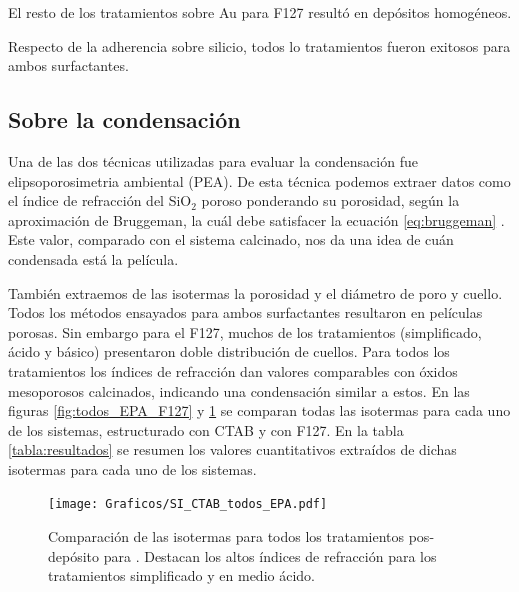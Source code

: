			El resto de los tratamientos sobre Au para F127 resultó en depósitos homogéneos.

			Respecto de la adherencia sobre silicio, todos lo tratamientos fueron exitosos para ambos surfactantes.

	\subsection{Sobre la condensación}

		Una de las dos técnicas utilizadas para evaluar la condensación fue elipsoporosimetria ambiental (PEA). De esta técnica podemos extraer datos como el índice de refracción del SiO$_2$ poroso ponderando su porosidad, según la aproximación de Bruggeman, la cuál debe satisfacer la ecuación \ref{eq:bruggeman} \cite{Bruggeman1935}. Este valor, comparado con el sistema calcinado, nos da una idea de cuán condensada está la película. 

		También extraemos de las isotermas la porosidad y el diámetro de poro y cuello. Todos los métodos ensayados para ambos surfactantes resultaron en películas porosas. Sin embargo para el F127, muchos de los tratamientos (simplificado, ácido y básico) presentaron doble distribución de cuellos. Para todos los tratamientos los índices de refracción dan valores comparables con óxidos mesoporosos calcinados, indicando una condensación similar a estos. En las figuras \ref{fig:todos_EPA_F127} y \ref{fig:todos_EPA_CTAB} se comparan todas las isotermas para cada uno de los sistemas, estructurado con CTAB y con F127. En la tabla \ref{tabla:resultados} se resumen los valores cuantitativos extraídos de dichas isotermas para cada uno de los sistemas.

			\begin{figure}[!th]
		 	   	   \begin{center}
		 	   	   \texttt{[image: Graficos/SI\_CTAB\_todos\_EPA.pdf]}
			   	   \caption[Comparación PEA tratamientos alternativos (CTAB)]{Comparación de las isotermas para todos los tratamientos pos-depósito para \pdmC\space. Destacan los altos índices de refracción para los tratamientos simplificado y en medio ácido.}
				   \label{fig:todos_EPA_CTAB}	
				   \end{center}
				   \end{figure}
						   
